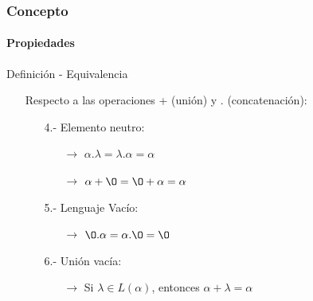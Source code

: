 \documentclass{beamer}
\begin{document}
        \begin{frame}
			\frametitle{Concepto}
			\framesubtitle{Propiedades}

			\begin{block}{Definici\'on - Equivalencia}
			    \begin{itemize}
			        \item[] Respecto a las operaciones + (uni\'on) y . (concatenaci\'on):
			        \begin{itemize}
			            \item[4.-] Elemento neutro:
			            \begin{itemize}
			                \item[$\rightarrow$] $\alpha.\lambda = \lambda.\alpha = \alpha$
			                \item[$\rightarrow$] $\alpha + \O = \O + \alpha = \alpha$
			            \end{itemize}
			            \item[5.-] Lenguaje Vac\'io:
			            \begin{itemize}
			                \item[$\rightarrow$] $\O.\alpha = \alpha.\O = \O$
			            \end{itemize}
			            \item[6.-] Uni\'on vac\'ia:
			            \begin{itemize}
			                \item[$\rightarrow$] Si $\lambda \in L(\alpha)$, entonces $\alpha + \lambda = \alpha $
			            \end{itemize}
			        \end{itemize}
			    \end{itemize}
			\end{block}
		\end{frame}
\end{document}
